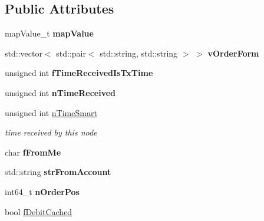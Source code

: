 \subsection*{Public Attributes}
\begin{DoxyCompactItemize}
\item 
\mbox{\label{class_c_wallet_tx_a17229eca0c81245312115a9c333203d8}} 
map\+Value\+\_\+t {\bfseries map\+Value}
\item 
\mbox{\label{class_c_wallet_tx_a923dbbba343b8f4d1c3d89ae73bdcea0}} 
std\+::vector$<$ std\+::pair$<$ std\+::string, std\+::string $>$ $>$ {\bfseries v\+Order\+Form}
\item 
\mbox{\label{class_c_wallet_tx_ac058c61be3a1c680a3ad384ff04d27eb}} 
unsigned int {\bfseries f\+Time\+Received\+Is\+Tx\+Time}
\item 
\mbox{\label{class_c_wallet_tx_af4f4b58875061467026da7b259532b69}} 
unsigned int {\bfseries n\+Time\+Received}
\item 
\mbox{\label{class_c_wallet_tx_a3c9ba52ce7203b9f16235785a09c383c}} 
unsigned int \mbox{\hyperlink{class_c_wallet_tx_a3c9ba52ce7203b9f16235785a09c383c}{n\+Time\+Smart}}
\begin{DoxyCompactList}\small\item\em time received by this node \end{DoxyCompactList}\item 
\mbox{\label{class_c_wallet_tx_a1598bf4a18fd05ce5eaaa0c3eb58ff28}} 
char {\bfseries f\+From\+Me}
\item 
\mbox{\label{class_c_wallet_tx_a099b5ca562f8a8378124b345b9123f25}} 
std\+::string {\bfseries str\+From\+Account}
\item 
\mbox{\label{class_c_wallet_tx_af51e160ff1d9d78986e9f239c7ac7a35}} 
int64\+\_\+t {\bfseries n\+Order\+Pos}
\item 
\mbox{\label{class_c_wallet_tx_ad2dca68c99f2e677e5999c9872a269da}} 
bool \mbox{\hyperlink{class_c_wallet_tx_ad2dca68c99f2e677e5999c9872a269da}{f\+Debit\+Cached}}

\end{DoxyCompactItemize}
